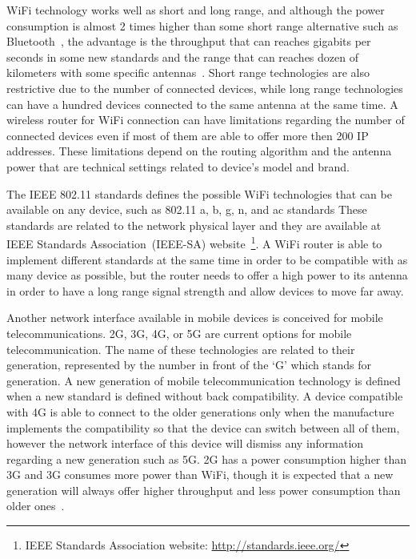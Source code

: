 WiFi technology works well as short and long range, and although the power consumption is almost 2 times higher than some short range alternative such as Bluetooth~\citep{Friedman2013wifibluetooth}, the advantage is the throughput that can reaches gigabits per seconds in some new standards and the range that can reaches dozen of kilometers with some specific antennas~\citep{Raman2007Experienceswifiindia}.
Short range technologies are also restrictive due to the number of connected devices, while long range technologies can have a hundred devices connected to the same antenna at the same time.
A wireless router for WiFi connection can have limitations regarding the number of connected devices even if most of them are able to offer more then 200 IP addresses.
These limitations depend on the routing algorithm and the antenna power that are technical settings related to device's model and brand.

The IEEE 802.11 standards defines the possible WiFi technologies that can be available on any device, such as 802.11 a, b, g, n, and ac standards
These standards are related to the network physical layer and they are available at IEEE Standards Association~(IEEE-SA) website~\footnote{IEEE Standards Association website: \url{http://standards.ieee.org/}}.
A WiFi router is able to implement different standards at the same time in order to be compatible with as many device as possible, but the router needs to offer a high power to its antenna in order to have a long range signal strength and allow devices to move far away.

Another network interface available in mobile devices is conceived for mobile telecommunications.
2G, 3G, 4G, or 5G are current options for mobile telecommunication.
The name of these technologies are related to their generation, represented by the number in front of the `G' which stands for generation.
A new generation of mobile telecommunication technology is defined when a new standard is defined without back compatibility.
A device compatible with 4G is able to connect to the older generations only when the manufacture implements the compatibility so that the device can switch between all of them, however the network interface of this device will dismiss any information regarding a new generation such as 5G.
2G has a power consumption higher than 3G and 3G consumes more power than WiFi, though it is expected that a new generation will always offer higher throughput and less power consumption than older ones~\citep{Rice2010decomposing,Balasubramanian2009energy}.

